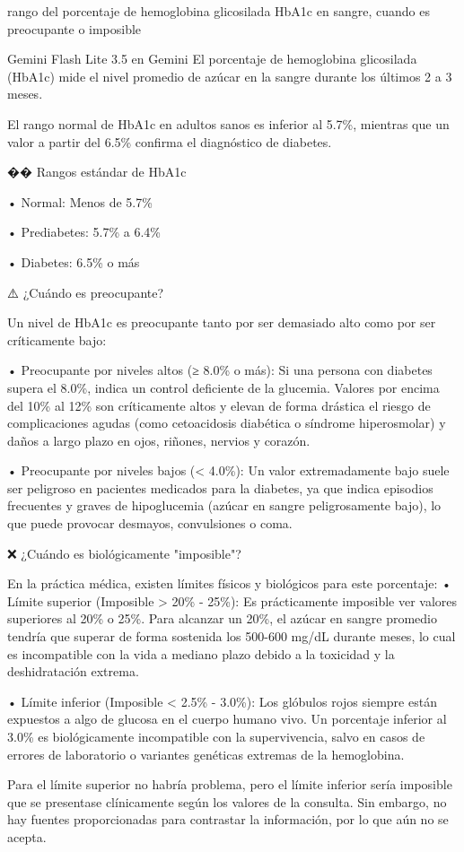 \documentclass[12pt,a4paper,oneside]{book}
\begin{document}
\begin{iaprompt}
rango del porcentaje de hemoglobina glicosilada HbA1c en sangre, cuando es preocupante o imposible
\end{iaprompt}
\begin{iaresp}{Gemini Flash Lite 3.5 en Gemini}
El porcentaje de hemoglobina glicosilada (HbA1c) mide el nivel promedio de azúcar en la sangre durante los últimos 2 a 3 meses.

El rango normal de HbA1c en adultos sanos es inferior al 5.7\%, mientras que un valor a partir del 6.5\% confirma el diagnóstico de diabetes.

�� Rangos estándar de HbA1c

• Normal: Menos de 5.7\%

• Prediabetes: 5.7\% a 6.4\%

• Diabetes: 6.5\% o más

⚠️ ¿Cuándo es preocupante?

Un nivel de HbA1c es preocupante tanto por ser demasiado alto como por ser críticamente bajo:

• Preocupante por niveles altos (≥ 8.0\% o más): Si una persona con diabetes supera el 8.0\%, indica un control deficiente de la glucemia. Valores por encima del 10\% al 12\% son críticamente altos y elevan de forma drástica el riesgo de complicaciones agudas (como cetoacidosis diabética o síndrome hiperosmolar) y daños a largo plazo en ojos, riñones, nervios y corazón.

• Preocupante por niveles bajos (< 4.0\%): Un valor extremadamente bajo suele ser peligroso en pacientes medicados para la diabetes, ya que indica episodios frecuentes y graves de hipoglucemia (azúcar en sangre peligrosamente bajo), lo que puede provocar desmayos, convulsiones o coma.

❌ ¿Cuándo es biológicamente "imposible"?

En la práctica médica, existen límites físicos y biológicos para este porcentaje:
• Límite superior (Imposible > 20\% - 25\%): Es prácticamente imposible ver valores superiores al 20\% o 25\%. Para alcanzar un 20\%, el azúcar en sangre promedio tendría que superar de forma sostenida los 500-600 mg/dL durante meses, lo cual es incompatible con la vida a mediano plazo debido a la toxicidad y la deshidratación extrema.

• Límite inferior (Imposible < 2.5\% - 3.0\%): Los glóbulos rojos siempre están expuestos a algo de glucosa en el cuerpo humano vivo. Un porcentaje inferior al 3.0\% es biológicamente incompatible con la supervivencia, salvo en casos de errores de laboratorio o variantes genéticas extremas de la hemoglobina.
\end{iaresp}
\begin{iaanalisis}
Para el límite superior no habría problema, pero el límite inferior sería imposible que se presentase clínicamente según los valores de la consulta. Sin embargo, no hay fuentes proporcionadas para contrastar la información, por lo que aún no se acepta.
\end{iaanalisis}
\end{document}
